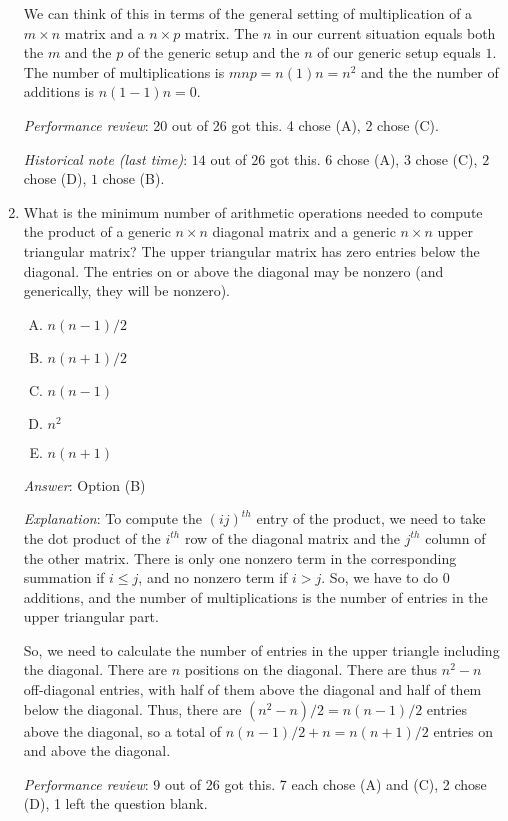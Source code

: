\documentclass[10pt]{amsart}
\begin{document}
\begin{enumerate}
  We can think of this in terms of the general setting of
  multiplication of a $m \times n$ matrix and a $n \times p$
  matrix. The $n$ in our current situation equals both the $m$ and the
  $p$ of the generic setup and the $n$ of our generic setup equals
  $1$. The number of multiplications is $mnp = n(1)n = n^2$ and the
  the number of additions is $n(1 - 1)n = 0$.
  
  {\em Performance review}: 20 out of 26 got this. 4 chose (A), 2 chose (C).

  {\em Historical note (last time)}: $14$ out of $26$ got this. $6$ chose (A),
  $3$ chose (C), $2$ chose (D), $1$ chose (B).

\item What is the minimum number of arithmetic operations needed to
  compute the product of a generic $n \times n$ diagonal matrix and a
  generic $n \times n$ upper triangular matrix?  The upper triangular
  matrix has zero entries below the diagonal. The entries on or above
  the diagonal may be nonzero (and generically, they will be nonzero).

  \begin{enumerate}[(A)]
  \item $n(n - 1)/2$
  \item $n(n + 1)/2$
  \item $n(n - 1)$
  \item $n^2$
  \item $n(n + 1)$
  \end{enumerate}

  {\em Answer}: Option (B)

  {\em Explanation}: To compute the $(ij)^{th}$ entry of the product,
  we need to take the dot product of the $i^{th}$ row of the diagonal
  matrix and the $j^{th}$ column of the other matrix. There is only
  one nonzero term in the corresponding summation if $i \le j$, and no
  nonzero term if $i > j$. So, we have to do $0$ additions, and the
  number of multiplications is the number of entries in the upper
  triangular part.

  So, we need to calculate the number of entries in the upper triangle
  including the diagonal. There are $n$ positions on the
  diagonal. There are thus $n^2 - n$ off-diagonal entries, with half
  of them above the diagonal and half of them below the
  diagonal. Thus, there are $(n^2 - n)/2 = n(n - 1)/2$ entries above
  the diagonal, so a total of $n(n - 1)/2 + n = n(n + 1)/2$ entries on
  and above the diagonal.

  {\em Performance review}: 9 out of 26 got this. 7 each chose (A) and
  (C), 2 chose (D), 1 left the question blank.


\end{enumerate}
\end{document}
